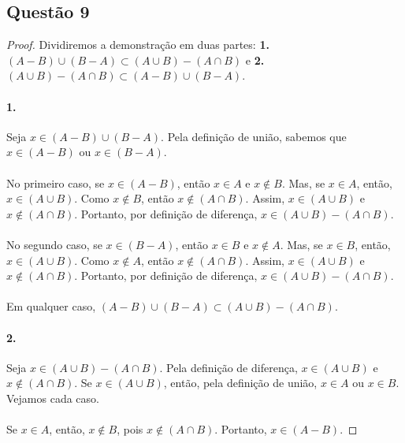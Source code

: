 \documentclass[9pt,twocolumn,a4paper]{article}
\begin{document}
    \subsection{Questão 9}
    \begin{proof}
    Dividiremos a demonstração em duas partes: \textbf{1.} $(A - B) \cup (B - A) \subset (A \cup B) - (A \cap B)$ e \textbf{2.} $(A \cup B) - (A \cap B) \subset (A - B) \cup (B - A)$.

    \paragraph{1.}
    Seja $x \in (A - B) \cup (B - A)$. Pela definição de união, sabemos que $x \in (A - B)$ ou $x \in (B - A)$. 
    
    \paragraph{}
    No primeiro caso, se $x \in (A - B)$, então $x \in A$ e $x \not\in B$. Mas, se $x \in A$, então, $x \in (A \cup B)$. Como $x \not\in B$, então $x \not\in (A \cap B)$. Assim, $x \in (A \cup B)$ e $x \not\in (A \cap B)$. Portanto, por definição de diferença, $x \in (A \cup B) - (A \cap B)$.

    \paragraph{}
    No segundo caso, se $x \in (B - A)$, então $x \in B$ e $x \not\in A$. Mas, se $x \in B$, então, $x \in (A \cup B)$. Como $x \not\in A$, então $x \not\in (A \cap B)$. Assim, $x \in (A \cup B)$ e $x \not\in (A \cap B)$. Portanto, por definição de diferença, $x \in (A \cup B) - (A \cap B)$.

    \paragraph{}
    Em qualquer caso, $(A - B) \cup (B - A) \subset (A \cup B) - (A \cap B)$.

    \paragraph{2.}
    Seja $x \in (A \cup B) - (A \cap B)$. Pela definição de diferença, $x \in (A \cup B)$ e $x \not\in (A \cap B)$. Se $x \in (A \cup B)$, então, pela definição de união, $x \in A $ ou $x \in B$. Vejamos cada caso.

    \paragraph{}
    Se $x \in A$, então, $x \not\in B$, pois $x \not\in (A \cap B)$. Portanto, $x \in (A - B)$. 
    

\end{proof}
\end{document}
